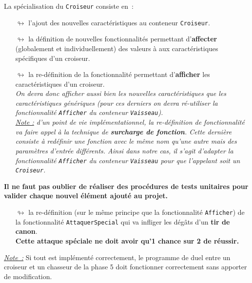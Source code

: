 \documentclass[10pt, fleqn, a4paper]{article}
\newcommand{\bfcolor}[2]{\textcolor{#1}{\textbf{#2}}}
\newcommand{\itcolor}[2]{\textcolor{#1}{\textit{#2}}}
\newcommand\myframecolor{}
\newcommand\mybgcolor{}
\newenvironment{mycolorbox}[2]
{
\def\myframecolor{#1}
\def\mybgcolor{#2}
\begingroup
\begin{lrbox}{\mytextbox}
\begin{minipage}[t]{\textwidth}
}
{
\end{minipage}\end{lrbox}
\fcolorbox{\myframecolor}{\mybgcolor}{\usebox{\mytextbox}}
\endgroup
}
\begin{document}
La spécialisation du \texttt{Croiseur} consiste en~:
\begin{itemize}
\item[$\looparrowright$] l'ajout des nouvelles caractéristiques au conteneur \texttt{Croiseur}.
\item[$\looparrowright$] la définition de nouvelles fonctionnalités permettant d'\textbf{affecter} (globalement et individuellement) des valeurs à aux caractéristiques spécifiques d'un croiseur.
\item[$\looparrowright$] la re-définition de la fonctionnalité permettant d'\textbf{afficher} les caractéristiques d'un croiseur.\\
\itcolor{blueTD}{On devra donc afficher aussi bien les nouvelles caractéristiques que les caractéristiques génériques (pour ces derniers on devra ré-utiliser la fonctionnalité \texttt{Afficher} du conteneur \texttt{Vaisseau}).}\\
\itcolor{redCM}{\underline{Note :} d'un point de vie implémentationnel, la re-définition de fonctionnalité va faire appel à la technique de \textbf{surcharge de fonction}. Cette dernière consiste à redéfinir une fonction avec le même nom qu'une autre mais des paramètres d'entrée différents. Ainsi dans notre cas, il s'agit d'adapter la fonctionnalité \textnormal{\texttt{Afficher}} du conteneur \textnormal{\texttt{Vaisseau}} pour que l'\og{}appelant\fg{} soit un \textnormal{\texttt{Croiseur}}.}
\end{itemize}
\begin{mycolorbox}{black}{yellow}
\bfcolor{greenC2}{Il ne faut pas oublier de réaliser des procédures de tests unitaires pour valider chaque nouvel élément ajouté au projet.}
\end{mycolorbox}
\begin{itemize}
\item[$\looparrowright$] la re-définition (sur le même principe que la fonctionnalité \texttt{Afficher}) de la fonctionnalité \texttt{AttaquerSpecial} qui va infliger les dégâts d'un \bfcolor{blueTD}{tir de canon}.\\
\bfcolor{greenTP}{Cette attaque spéciale ne doit avoir qu'1 chance sur 2 de réussir.}
\end{itemize}

\begin{mycolorbox}{black}{yellow}
\itcolor{redCM}{\underline{Note~:}} Si tout est implémenté correctement, le programme de duel entre un croiseur et un chasseur de la phase 5 doit fonctionner correctement sans apporter de modification.
\end{mycolorbox}
\end{document}
